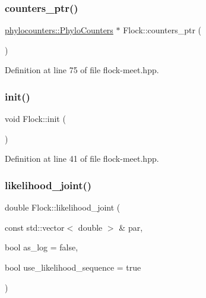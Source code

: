 \subsubsection{\texorpdfstring{counters\+\_\+ptr()}{counters\_ptr()}}
{\footnotesize\ttfamily \hyperlink{namespacebarry_1_1counters_1_1phylo_a4e401ffe66d04091343dcffaf915f8c3}{phylocounters\+::\+Phylo\+Counters} $\ast$ Flock\+::counters\+\_\+ptr (\begin{DoxyParamCaption}{ }\end{DoxyParamCaption})\hspace{0.3cm}{\ttfamily [inline]}}



Definition at line 75 of file flock-\/meet.\+hpp.

\mbox{\label{class_flock_a99f3c0a3aacc8af28c13207dd81d7164}} 
\subsubsection{\texorpdfstring{init()}{init()}}
{\footnotesize\ttfamily void Flock\+::init (\begin{DoxyParamCaption}{ }\end{DoxyParamCaption})\hspace{0.3cm}{\ttfamily [inline]}}



Definition at line 41 of file flock-\/meet.\+hpp.

\mbox{\label{class_flock_a701dce27fdc0a20e63caec1e1fd3def7}} 
\subsubsection{\texorpdfstring{likelihood\+\_\+joint()}{likelihood\_joint()}}
{\footnotesize\ttfamily double Flock\+::likelihood\+\_\+joint (\begin{DoxyParamCaption}\item[{const std\+::vector$<$ double $>$ \&}]{par,  }\item[{bool}]{as\+\_\+log = {\ttfamily false},  }\item[{bool}]{use\+\_\+likelihood\+\_\+sequence = {\ttfamily true} }\end{DoxyParamCaption})\hspace{0.3cm}{\ttfamily [inline]}}



